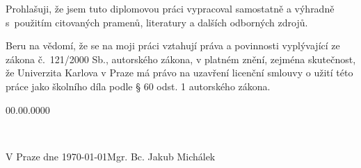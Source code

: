 \noindent Prohlašuji, že jsem tuto diplomovou práci vypracoval samostatně
a výhradně s~použitím citovaných pramenů, literatury a dalších odborných
zdrojů. 

\noindent Beru na vědomí, že se na moji práci vztahují práva a povinnosti
vyplývající ze zákona č.~121/2000 Sb., autorského zákona, v platném
znění, zejména skutečnost, že Univerzita Karlova v Praze má právo
na uzavření licenční smlouvy o užití této práce jako školního díla
podle § 60 odst. 1 autorského zákona.
\begin{lyxlist}{00.00.0000}
\item [{ \vspace*{1cm}
}]~
\end{lyxlist}
\noindent V Praze dne \today\hfill{}Mgr. Bc. Jakub Michálek
